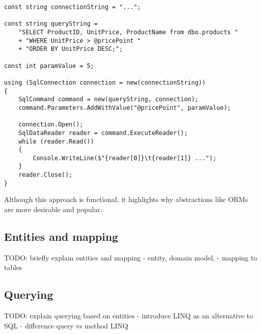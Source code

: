 \begin{lstlisting}[language=CSharp]
const string connectionString = "...";

const string queryString =
    "SELECT ProductID, UnitPrice, ProductName from dbo.products "
    + "WHERE UnitPrice > @pricePoint "
    + "ORDER BY UnitPrice DESC;";

const int paramValue = 5;

using (SqlConnection connection = new(connectionString))
{
    SqlCommand command = new(queryString, connection);
    command.Parameters.AddWithValue("@pricePoint", paramValue);

    connection.Open();
    SqlDataReader reader = command.ExecuteReader();
    while (reader.Read())
    {
        Console.WriteLine($"{reader[0]}\t{reader[1]} ...");
    }
    reader.Close();
}
\end{lstlisting}

Although this approach is functional, it highlights why abstractions like ORMs are more desirable and popular.

\subsection{Entities and mapping}

TODO: briefly explain entities and mapping
- entity, domain model,
- mapping to tables

\subsection{Querying}

TODO: explain querying based on entities
- introduce LINQ as an alternative to SQL
- difference query vs method LINQ